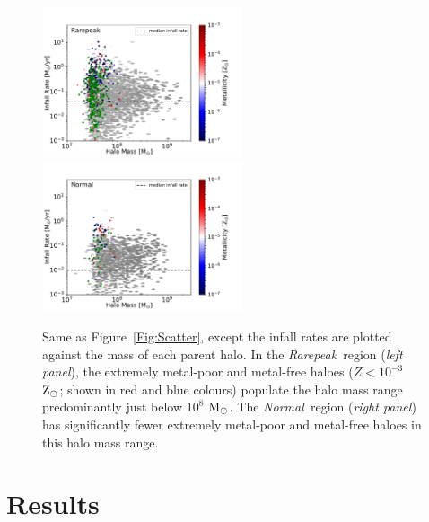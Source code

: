 \documentclass[graphics, twocolumn, usenatbib]{mn2e}
\newcommand{\msolarc} {$\rm{M_{\odot}}$}
\newcommand{\zsolarc} {$\rm{Z_{\odot}}$}
\newcommand{\rarepeak} {\textit{Rarepeak~}}
\newcommand{\normal} {\textit{Normal~}}
\newcommand{\void} {\textit{Void~}}
\begin{document}
\begin{figure}
\centering
\begin{minipage}{175mm}      \begin{center} 
\centerline{
\includegraphics[width=0.525\textwidth]{FIGURES/Rarepeak_MdotMHaloZ_Hexbin.pdf}
\includegraphics[width=0.525\textwidth]{FIGURES/Normal_MdotMHaloZ_Hexbin.pdf}}
\caption{Same as Figure~\ref{Fig:Scatter}, except
the infall rates are plotted against the mass of each parent halo.
In the \rarepeak region (\textit{left panel}), the extremely metal-poor
  and metal-free haloes ($Z < 10^{-3}$ \zsolarc; shown in red and blue colours) populate the halo mass range predominantly just below $10^{8}$
  \msolarc.  The \normal region (\textit{right panel})
 has significantly fewer extremely metal-poor and metal-free haloes in this halo mass range.}
\label{Fig:HaloMass}
\end{center} \end{minipage}

\end{figure}


\section{Results} \label{Sec:Results}
\end{document}
